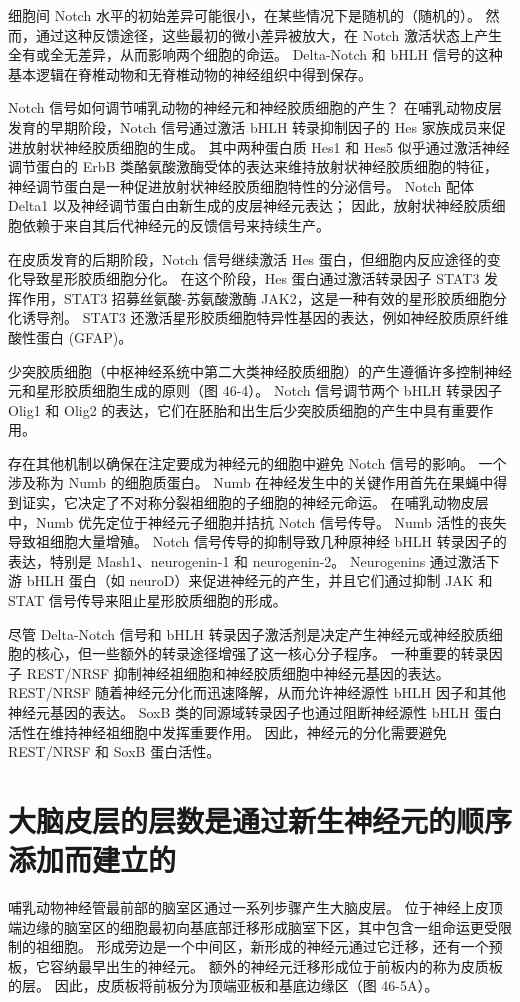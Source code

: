 细胞间 Notch 水平的初始差异可能很小，在某些情况下是随机的（随机的）。 然而，通过这种反馈途径，这些最初的微小差异被放大，在 Notch 激活状态上产生全有或全无差异，从而影响两个细胞的命运。 Delta-Notch 和 bHLH 信号的这种基本逻辑在脊椎动物和无脊椎动物的神经组织中得到保存。

Notch 信号如何调节哺乳动物的神经元和神经胶质细胞的产生？ 在哺乳动物皮层发育的早期阶段，Notch 信号通过激活 bHLH 转录抑制因子的 Hes 家族成员来促进放射状神经胶质细胞的生成。 其中两种蛋白质 Hes1 和 Hes5 似乎通过激活神经调节蛋白的 ErbB 类酪氨酸激酶受体的表达来维持放射状神经胶质细胞的特征，神经调节蛋白是一种促进放射状神经胶质细胞特性的分泌信号。 Notch 配体 Delta1 以及神经调节蛋白由新生成的皮层神经元表达； 因此，放射状神经胶质细胞依赖于来自其后代神经元的反馈信号来持续生产。

在皮质发育的后期阶段，Notch 信号继续激活 Hes 蛋白，但细胞内反应途径的变化导致星形胶质细胞分化。 在这个阶段，Hes 蛋白通过激活转录因子 STAT3 发挥作用，STAT3 招募丝氨酸-苏氨酸激酶 JAK2，这是一种有效的星形胶质细胞分化诱导剂。 STAT3 还激活星形胶质细胞特异性基因的表达，例如神经胶质原纤维酸性蛋白 (GFAP)。

少突胶质细胞（中枢神经系统中第二大类神经胶质细胞）的产生遵循许多控制神经元和星形胶质细胞生成的原则（图 46-4）。 Notch 信号调节两个 bHLH 转录因子 Olig1 和 Olig2 的表达，它们在胚胎和出生后少突胶质细胞的产生中具有重要作用。

存在其他机制以确保在注定要成为神经元的细胞中避免 Notch 信号的影响。 一个涉及称为 Numb 的细胞质蛋白。 Numb 在神经发生中的关键作用首先在果蝇中得到证实，它决定了不对称分裂祖细胞的子细胞的神经元命运。 在哺乳动物皮层中，Numb 优先定位于神经元子细胞并拮抗 Notch 信号传导。 Numb 活性的丧失导致祖细胞大量增殖。 Notch 信号传导的抑制导致几种原神经 bHLH 转录因子的表达，特别是 Mash1、neurogenin-1 和 neurogenin-2。 Neurogenins 通过激活下游 bHLH 蛋白（如 neuroD）来促进神经元的产生，并且它们通过抑制 JAK 和 STAT 信号传导来阻止星形胶质细胞的形成。

尽管 Delta-Notch 信号和 bHLH 转录因子激活剂是决定产生神经元或神经胶质细胞的核心，但一些额外的转录途径增强了这一核心分子程序。 一种重要的转录因子 REST/NRSF 抑制神经祖细胞和神经胶质细胞中神经元基因的表达。 REST/NRSF 随着神经元分化而迅速降解，从而允许神经源性 bHLH 因子和其他神经元基因的表达。 SoxB 类的同源域转录因子也通过阻断神经源性 bHLH 蛋白活性在维持神经祖细胞中发挥重要作用。 因此，神经元的分化需要避免 REST/NRSF 和 SoxB 蛋白活性。


\section{大脑皮层的层数是通过新生神经元的顺序添加而建立的}
哺乳动物神经管最前部的脑室区通过一系列步骤产生大脑皮层。 位于神经上皮顶端边缘的脑室区的细胞最初向基底部迁移形成脑室下区，其中包含一组命运更受限制的祖细胞。 形成旁边是一个中间区，新形成的神经元通过它迁移，还有一个预板，它容纳最早出生的神经元。 额外的神经元迁移形成位于前板内的称为皮质板的层。 因此，皮质板将前板分为顶端亚板和基底边缘区（图 46-5A）。

